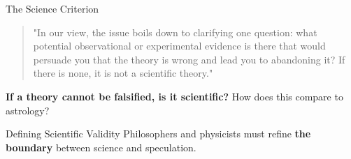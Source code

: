\begin{frame}{The Science Criterion}
  \begin{quote}
    "In our view, the issue boils down to clarifying one question: what
    potential observational or experimental evidence is there that
    would persuade you that the theory is wrong and lead you to abandoning it?
    If there is none, it is not a scientific theory." \cite{Ellis2014}
  \end{quote}
  \vspace{0.5cm}
  \textbf{If a theory cannot be falsified, is it scientific?}
  How does this compare to astrology?
\end{frame}

\begin{frame}{Defining Scientific Validity}
  Philosophers and physicists must refine \textbf{the boundary}
  between science and speculation.
\end{frame}
